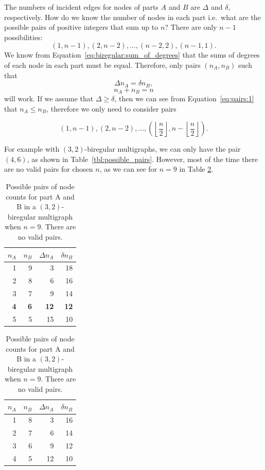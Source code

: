 The numbers of incident edges for nodes of parts $A$ and $B$ are $\Delta$ and $\delta$, respectively.
How do we know the number of nodes in each part i.e.\ what are the possible pairs of positive integers that sum up to $n$?
There are only $n-1$ possibilities:
$$(1, n-1), (2, n-2), ..., (n-2, 2), (n-1, 1).$$
We know from Equation~\ref{eq:biregular:sum_of_degrees} that the sums of degrees of each node in each part must be equal.
Therefore, only pairs $(n_A, n_B)$ such that
\begin{equation} \label{eq:pairs:1}
  \Delta n_A = \delta n_B,
\end{equation}
\begin{equation} \label{eq:pairs:2}
n_A + n_B = n
\end{equation}
will work.
If we assume that $\Delta \geq \delta$, then we can see from Equation~\ref{eq:pairs:1} that $n_A\leq n_B$, therefore we only need to consider pairs

$$(1, n-1), (2, n-2), ..., (\left\lfloor\frac{n}{2}\right\rfloor, n - \left\lfloor\frac{n}{2}\right\rfloor).$$

For example with $(3,2)$-biregular multigraphs, we can only have the pair $(4, 6)$, as shown in Table~\ref{tbl:possible_pairs}.
However, most of the time there are no valid pairs for chosen $n$, as we can see for $n=9$ in Table \ref{tbl:possible_pairs:no_pairs}.

\begin{table}[H]
  \parbox{.45\linewidth}{
    \centering
    \begin{tabular}{rrrr}
    \toprule
    $n_A$&$n_B$&$\Delta n_A$&$\delta n_B$\\
    \midrule
    1 & 9 & 3  & 18\\
    2 & 8 & 6  & 16\\
    3 & 7 & 9  & 14\\
    \textbf{4} & \textbf{6} & \textbf{12} & \textbf{12}\\
    5 & 5 & 15 & 10\\
    \bottomrule
  \end{tabular}
  \caption{
    Possible pairs of node counts for part A and B in a $(3,2)$-biregular multigraph when $n=10$.
    The only valid pair with $\Delta n_A = \delta n_B$ is (4, 6), and it is bolded.
  }
  \label{tbl:possible_pairs}
  }
  \hfill
  \parbox{.45\linewidth}{
  \centering
  \begin{tabular}{rrrr}
    \toprule
    $n_A$&$n_B$&$\Delta n_A$&$\delta n_B$\\
    \midrule
    1 & 8 & 3  & 16\\
    2 & 7 & 6  & 14\\
    3 & 6 & 9  & 12\\
    4 & 5 & 12 & 10\\
    \bottomrule
  \end{tabular}
  \caption{
    Possible pairs of node counts for part A and B in a $(3,2)$-biregular multigraph when $n=9$.
    There are no valid pairs.
  }
  \label{tbl:possible_pairs:no_pairs}
  }
\end{table}

